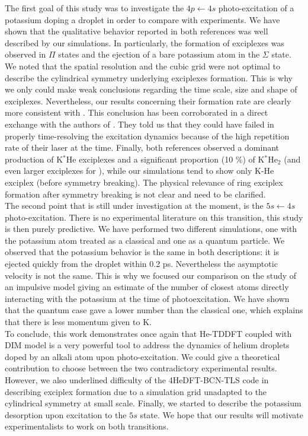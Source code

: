 The first goal of this study was to investigate the $4p \leftarrow 4s$ photo-excitation of a potassium doping a droplet in order to compare with experiments. 
We have shown that the qualitative behavior reported in both references \cite{Reh2000A,Reh2000B,Sch2001} was well described by our simulations.
In particularly, the formation of exciplexes was observed in $\Pi$ states and the ejection of a bare potassium atom in the $\Sigma$ state. 
We noted that the spatial resolution and the cubic grid were not optimal to describe the cylindrical symmetry underlying exciplexes formation.
This is why we only could make weak conclusions regarding the time scale, size and shape of exciplexes. 
Nevertheless, our results concerning their formation rate are clearly more consistent with \cite{Reh2000A,Reh2000B}.
This conclusion has been corroborated in a direct exchange with the authors of \cite{Sch2001}.
They told us that they could have failed in properly time-resolving the excitation dynamics because of the high repetition rate of their laser at the time. 
Finally, both references observed a dominant production of K$^*$He exciplexes and a significant proportion (10 \%) of K$^*$He$_2$ (and even larger exciplexes for \cite{Sch2001}), while our simulations tend to show only K-He exciplex (before symmetry breaking). 
The physical relevance of ring exciplex formation after symmetry breaking is not clear and need to be clarified.\\

The second point that is still under investigation at the moment, is the $5s \leftarrow 4s$ photo-excitation. 
There is no experimental literature on this transition, this study is then purely predictive. 
We have performed two different simulations, one with the potassium atom treated as a classical and one as a quantum particle.
 We observed that the potassium behavior is the same in both descriptions: it is ejected quickly from the droplet within 0.2 ps. 
 Nevertheless the asymptotic velocity is not the same.
This is why we focused our comparison on the study of an impulsive model giving an estimate of the number of closest atoms directly interacting with the potassium at the time of photoexcitation. 
We have shown that the quantum case gave a lower number than the classical one, which explains that there is less momentum given to K.\\

To conclude, this work demonstrates once again that He-TDDFT coupled with DIM model is a very powerful tool to address the dynamics of helium droplets doped by an alkali atom upon photo-excitation. 
We could give a theoretical contribution to choose between the two contradictory experimental results. 
However, we also underlined difficulty of the 4HeDFT-BCN-TLS code in describing exciplex formation due to a simulation grid unadapted to the cylindrical symmetry at small scale. 
Finally, we started to describe the potassium desorption upon excitation to the $5s$ state. 
We hope that our results will motivate experimentalists to work on both transitions.\\ 

